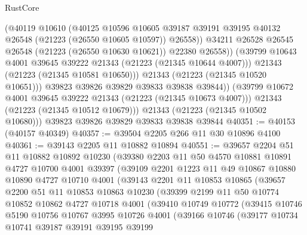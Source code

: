 \begin{lexlean}{RustCore}
\begin{coremodule}
                    (@40119
                      @10610
                      (@40125
                        @10596
                        @10605
                        @39187
                        @39191
                        @39195
                        @40132
                        @26548
                        (@21223 (@26550 @10605 @10597))
                        @26558))
                    @34211
                    @26528
                    @26545
                    @26548
                    (@21223 (@26550 @10630 @10621))
                    @22380
                    @26558))
                (@39799 @10643 @4001 @39645 @39222 @21343 (@21223 (@21345 @10644 @4007)))
                @21343
                (@21223 (@21345 @10581 @10650)))
              @21343
              (@21223 (@21345 @10520 @10651)))
            @39823
            @39826
            @39829
            @39833
            @39838
            @39844))
        (@39799 @10672 @4001 @39645 @39222 @21343 (@21223 (@21345 @10673 @4007)))
        @21343
        (@21223 (@21345 @10512 @10679)))
      @21343
      (@21223 (@21345 @10502 @10680)))
    @39823
    @39826
    @39829
    @39833
    @39838
    @39844
@40351 := @40153 (@40157 @40349)
@40357 := @39504 @2205 @266 @11 @30 @10896 @4100
@40361 := @39143 @2205 @11 @10882 @10894
@40551 := @39657
    @2204
    @51
    @11
    @10882
    @10892
    @10230
    (@39380
      @2203
      @11
      @50
      @4570
      @10881
      @10891
      @4727
      @10700
      @4001
      @39397
      (@39109
        @2201
        @1223
        @11
        @49
        @10867
        @10880
        @10890
        @4727
        @10710
        @4001
        (@39143
          @2201
          @11
          @10853
          @10865
          (@39657
            @2200
            @51
            @11
            @10853
            @10863
            @10230
            (@39399
              @2199
              @11
              @50
              @10774
              @10852
              @10862
              @4727
              @10718
              @4001
              (@39410
                @10749
                @10772
                (@39415
                  @10746
                  @5190
                  @10756
                  @10767
                  @3995
                  @10726
                  @4001
                  (@39166
                    @10746
                    (@39177
                      @10734
                      @10741
                      @39187
                      @39191
                      @39195
                      @39199

\end{coremodule}
\end{lexlean}
